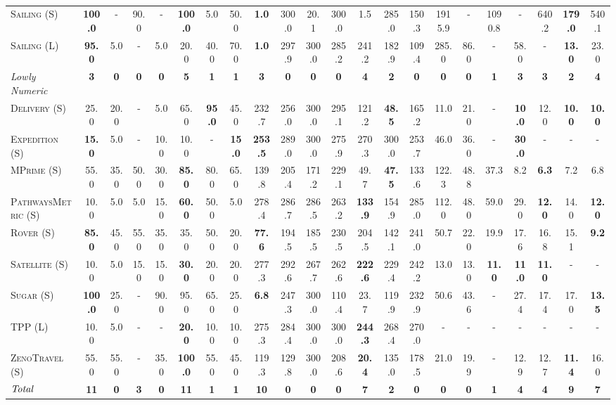 \documentclass[11pt,landscape]{article}
\begin{document}
\begin{table}[tb]
{\begin{tabular}{|l||ccccccc||ccccccc||ccccccc||}
\textsc{Sailing} (S)&\textbf{100.0}&-&90.0&-&\textbf{100.0}&5.0&50.0&\textbf{1.0}&300.0&20.1&300.0&1.5&285.0&150.3&1915.9&-&1090.8&-&640.2&\textbf{179.0}&540.1\\
\textsc{Sailing} (L)&\textbf{95.0}&5.0&-&5.0&20.0&40.0&70.0&\textbf{1.0}&297.9&300.0&285.2&241.2&182.9&109.4&285.0&86.0&-&58.0&-&\textbf{13.0}&23.0
\\\hline
\textit{Lowly Numeric}&\textbf{3}&\textbf{0}&\textbf{0}&\textbf{0}&\textbf{5}&\textbf{1}&\textbf{1}&\textbf{3}&\textbf{0}&\textbf{0}&\textbf{0}&\textbf{4}&\textbf{2}&\textbf{0}&\textbf{0}&\textbf{0}&\textbf{1}&\textbf{3}&\textbf{3}&\textbf{2}&\textbf{4}\\\hline
\textsc{Delivery} (S)&25.0&20.0&-&5.0&65.0&\textbf{95.0}&45.0&232.7&256.0&300.0&295.1&121.2&\textbf{48.5}&165.2&11.0&21.0&-&\textbf{10.0}&12.0&\textbf{10.0}&\textbf{10.0}\\
\textsc{Expedition} (S)&\textbf{15.0}&5.0&-&10.0&10.0&-&\textbf{15.0}&\textbf{253.5}&289.0&300.0&275.9&270.3&300.0&253.7&46.0&36.0&-&\textbf{30.0}&-&-&-\\
\textsc{MPrime} (S)&55.0&35.0&50.0&30.0&\textbf{85.0}&80.0&65.0&139.8&205.4&171.2&229.1&49.7&\textbf{47.5}&133.6&122.3&48.8&37.3&8.2&\textbf{6.3}&7.2&6.8\\
\textsc{PathwaysMetric} (S)&10.0&5.0&5.0&15.0&\textbf{60.0}&50.0&5.0&278.4&286.7&286.5&263.2&\textbf{133.9}&154.9&285.0&112.0&48.0&59.0&29.0&\textbf{12.0}&14.0&\textbf{12.0}\\
\textsc{Rover} (S)&\textbf{85.0}&45.0&55.0&35.0&35.0&50.0&20.0&\textbf{77.6}&194.5&185.5&230.5&204.5&142.1&241.0&50.7&22.0&19.9&17.6&16.8&15.1&\textbf{9.2}\\
\textsc{Satellite} (S)&10.0&5.0&15.0&15.0&\textbf{30.0}&20.0&20.0&277.3&292.6&267.7&262.6&\textbf{222.6}&229.4&242.2&13.0&13.0&\textbf{11.0}&\textbf{11.0}&\textbf{11.0}&-&-\\
\textsc{Sugar} (S)&\textbf{100.0}&25.0&-&90.0&95.0&65.0&25.0&\textbf{6.8}&247.3&300.0&110.4&23.7&119.9&232.9&50.6&43.6&-&27.4&17.4&17.0&\textbf{13.5}\\
\textsc{TPP} (L)&10.0&5.0&-&-&\textbf{20.0}&10.0&10.0&275.3&284.4&300.0&300.0&\textbf{244.3}&268.4&270.0&-&-&-&-&-&-&-\\
\textsc{ZenoTravel} (S)&55.0&55.0&-&35.0&\textbf{100.0}&55.0&45.0&119.3&129.8&300.0&208.6&\textbf{20.4}&135.0&178.5&21.0&19.9&-&12.9&12.7&\textbf{11.4}&16.0
\\\hline
$\emph{Total}$&\textbf{11}&\textbf{0}&\textbf{3}&\textbf{0}&\textbf{11}&\textbf{1}&\textbf{1}&\textbf{10}&\textbf{0}&\textbf{0}&\textbf{0}&\textbf{7}&\textbf{2}&\textbf{0}&\textbf{0}&\textbf{0}&\textbf{1}&\textbf{4}&\textbf{4}&\textbf{9}&\textbf{7}\\\hline

        \end{tabular}}
        \caption{}
        \label{tab:experiments-all}
        \end{table}
        
\end{document}
